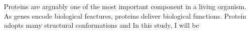 Proteins are arguably one of the most important component in a living organism. As genes encode biological feactures, proteins deliver biological functions. Protein adopts many structural conformations and   In this study, I will be 